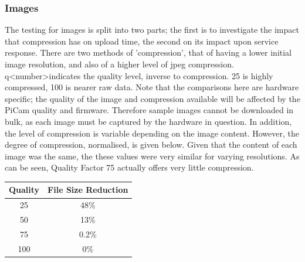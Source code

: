 \documentclass{article}
\begin{document}
\subsubsection{Images}
The testing for images is split into two parts; the first is to investigate the impact that compression has on upload time, the second on its impact upon service response. There are two methods of 'compression', that of having a lower initial image resolution, and also of a higher level of jpeg compression. q\textless number\textgreater indicates the quality level, inverse to compression. 25 is highly compressed, 100 is nearer raw data. Note that the comparisons here are hardware specific; the quality of the image and compression available will be affected by the PiCam quality and firmware. Therefore sample images cannot be downloaded in bulk, as each image must be captured by the hardware in question. In addition, the level of compression is variable depending on the image content. However, the degree of compression, normalised, is given below. Given that the content of each image was the same, the these values were very similar for varying resolutions. As can be seen, Quality Factor 75 actually offers very little compression. 
\begin{table}[h]
\centering
\begin{tabular}{| c | c |}
\hline
Quality & File Size Reduction\\ \hline
25 & 48\% \\ \hline
50 & 13\% \\ \hline
75 & 0.2\% \\ \hline
100 & 0\% \\ \hline
\end{tabular}
\end{table}
\end{document}
